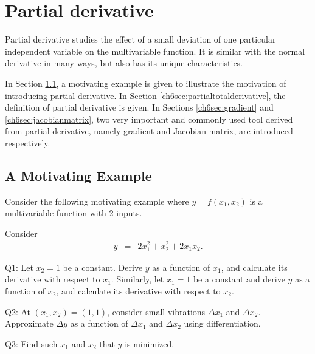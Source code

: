 \chapter{Partial derivative} \label{ch6ch}

Partial derivative studies the effect of a small deviation of one particular independent variable on the multivariable function. It is similar with the normal derivative in many ways, but also has its unique characteristics.

In Section \ref{ch6sec:motivatingexp}, a motivating example is given to illustrate the motivation of introducing partial derivative. In Section \ref{ch6sec:partialtotalderivative}, the definition of partial derivative is given. In Sections \ref{ch6sec:gradient} and \ref{ch6sec:jacobianmatrix}, two very important and commonly used tool derived from partial derivative, namely gradient and Jacobian matrix, are introduced respectively.

\section{A Motivating Example} \label{ch6sec:motivatingexp}

Consider the following motivating example where $y=f(x_1, x_2)$ is a multivariable function with $2$ inputs.

\begin{shortbox}

Consider
\begin{eqnarray}
    y &=& 2x_1^2 + x_2^2 + 2x_1x_2. \label{ch6eq:motivatingexample}
\end{eqnarray}

Q1: Let $x_2 = 1$ be a constant. Derive $y$ as a function of $x_1$, and calculate its derivative with respect to $x_1$. Similarly, let $x_1 = 1$ be a constant and derive $y$ as a function of $x_2$, and calculate its derivative with respect to $x_2$.

Q2: At $(x_1, x_2) = (1, 1)$, consider small vibrations $\Delta x_1$ and $\Delta x_2$. Approximate $\Delta y$ as a function of $\Delta x_1$ and $\Delta x_2$ using differentiation.

Q3: Find such $x_1$ and $x_2$ that $y$ is minimized.

\end{shortbox}

